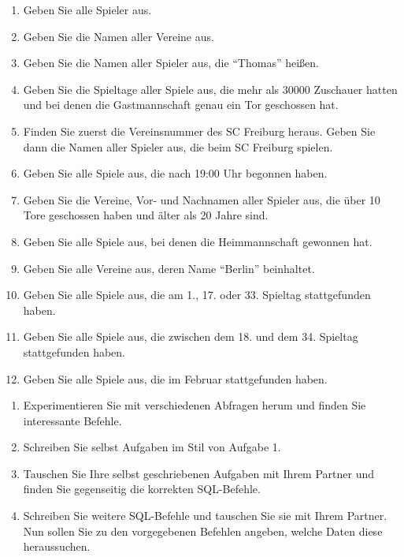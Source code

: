\documentclass[11pt, a4paper, oneside]{article}
\begin{document}
	\begin{enumerate}[label=\alph*)]
		\item Geben Sie alle Spieler aus.
		\item Geben Sie die Namen aller Vereine aus.
		\item Geben Sie die Namen aller Spieler aus, die ``Thomas'' heißen.
		\item Geben Sie die Spieltage aller Spiele aus, die mehr als 30000 Zuschauer hatten und bei denen die Gastmannschaft genau ein Tor geschossen hat.
		\item Finden Sie zuerst die Vereinsnummer des SC Freiburg heraus.
		Geben Sie dann die Namen aller Spieler aus, die beim SC Freiburg spielen.
		\item Geben Sie alle Spiele aus, die nach 19:00 Uhr begonnen haben.
		\item Geben Sie die Vereine, Vor- und Nachnamen aller Spieler aus, die über 10 Tore geschossen haben und älter als 20 Jahre sind.
		\item Geben Sie alle Spiele aus, bei denen die Heimmannschaft gewonnen hat.
		\item Geben Sie alle Vereine aus, deren Name ``Berlin'' beinhaltet.
		\item Geben Sie alle Spiele aus, die am 1., 17. oder 33. Spieltag stattgefunden haben.
		\item Geben Sie alle Spiele aus, die zwischen dem 18. und dem 34. Spieltag stattgefunden haben.
		\item Geben Sie alle Spiele aus, die im Februar stattgefunden haben.
	\end{enumerate}
	
	
	
	\begin{enumerate}[label=\alph*)]
		\item Experimentieren Sie mit verschiedenen Abfragen herum und finden Sie interessante Befehle.
		\item Schreiben Sie selbst Aufgaben im Stil von Aufgabe 1.
		\item Tauschen Sie Ihre selbst geschriebenen Aufgaben mit Ihrem Partner und finden Sie gegenseitig die korrekten SQL-Befehle.
		\item Schreiben Sie weitere SQL-Befehle und tauschen Sie sie mit Ihrem Partner.
		Nun sollen Sie zu den vorgegebenen Befehlen angeben, welche Daten diese heraussuchen.
	\end{enumerate}
\end{document}
